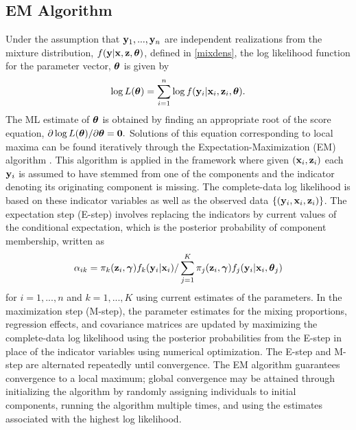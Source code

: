 \subsection{EM Algorithm}
Under the assumption that $\mathbf y_{1},...,\mathbf y_{n}$ are independent realizations from the mixture distribution, $f(\mathbf y | \mathbf x, \mathbf z, \boldsymbol\theta)$, defined in \ref{mixdens}, the log likelihood function for the parameter vector, $\boldsymbol \theta$ is given by
$$\log L(\boldsymbol\theta)=\sum^{n}_{i=1}\log f(\mathbf y_{i}|\mathbf x_{i},\mathbf z_{i},\boldsymbol \theta).$$
The ML estimate of $\boldsymbol\theta$ is obtained by finding an appropriate root of the score equation, $\partial \log L(\boldsymbol\theta)/\partial \boldsymbol\theta=\mathbf 0.$
Solutions of this equation corresponding to local maxima can be found iteratively through the Expectation-Maximization (EM) algorithm \cite{dempster1977}. This algorithm is applied in the framework where given $(\mathbf x_{i},\mathbf z_{i})$ each $\mathbf y_{i}$ is assumed to have stemmed from one of the components and the indicator denoting its originating component is missing. The complete-data log likelihood is based on these indicator variables as well as the observed data $\{(\mathbf y_{i}, \mathbf x_{i}, \mathbf z_{i})\}$. The expectation step (E-step) involves replacing the indicators by current values of the conditional expectation, which is the posterior probability of component membership, written as
$$\alpha_{ik}=\pi_{k}(\mathbf z_{i},\boldsymbol\gamma)f_{k}(\mathbf y_{i}|\mathbf x_{i})/\sum_{j=1}^{K}\pi_{j}(\mathbf z_{i},\boldsymbol\gamma)f_{j}(\mathbf y_{i}|\mathbf x_{i},\boldsymbol \theta_{j})$$
for $i=1,...,n$ and $k=1,...,K$ using current estimates of the parameters. In the maximization step (M-step), the parameter estimates for the mixing proportions, regression effects, and covariance matrices are updated by maximizing the complete-data log likelihood using the posterior probabilities from the E-step in place of the indicator variables using numerical optimization. The E-step and M-step are alternated repeatedly until convergence. The EM algorithm guarantees convergence to a local maximum; global convergence may be attained through initializing the algorithm by randomly assigning individuals to initial components, running the algorithm multiple times, and using the estimates associated with the highest log likelihood.
